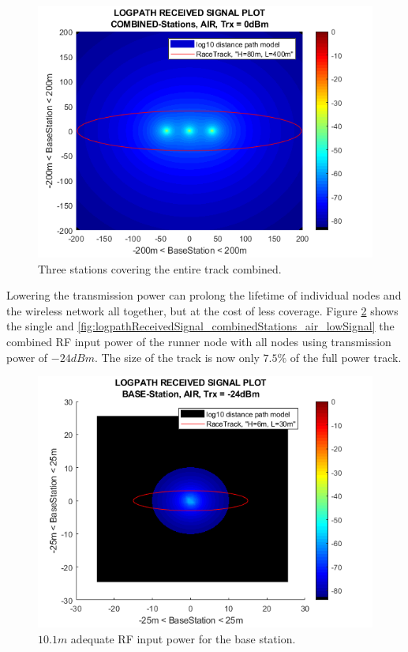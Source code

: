 \begin{figure}[h]
	\centering
	\includegraphics[width=\linewidth]{theory/pathLoss/fig/logpathReceivedSignal_combinedStations_air_highSignal.png}
	\caption{Three stations covering the entire track combined.}
	\label{fig:logpathReceivedSignal_combinedStations_air_highSignal}
\end{figure}

\noindent Lowering the transmission power can prolong the lifetime of individual nodes and the wireless network all together, but at the cost of less coverage. Figure \ref{fig:logpathReceivedSignal_baseStation_air_lowSignal} shows the single and \ref{fig:logpathReceivedSignal_combinedStations_air_lowSignal} the combined RF input power of the runner node with all nodes using transmission power of $-24dBm$. The size of the track is now only $7.5\%$ of the full power track. 

\begin{figure}[h]
	\centering
	\includegraphics[width=\linewidth]{theory/pathLoss/fig/logpathReceivedSignal_baseStation_air_lowSignal.png}
	\caption{$10.1m$ adequate RF input power for the base station.}
	\label{fig:logpathReceivedSignal_baseStation_air_lowSignal}
\end{figure}

